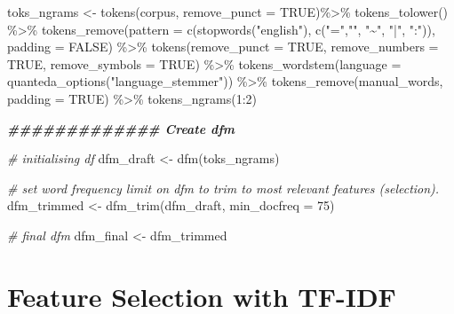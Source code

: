 \documentclass[
]{article}
\newenvironment{Shaded}{\begin{snugshade}}{\end{snugshade}}
\newcommand{\AttributeTok}[1]{\textcolor[rgb]{0.77,0.63,0.00}{#1}}
\newcommand{\CommentTok}[1]{\textcolor[rgb]{0.56,0.35,0.01}{\textit{#1}}}
\newcommand{\ConstantTok}[1]{\textcolor[rgb]{0.00,0.00,0.00}{#1}}
\newcommand{\DecValTok}[1]{\textcolor[rgb]{0.00,0.00,0.81}{#1}}
\newcommand{\DocumentationTok}[1]{\textcolor[rgb]{0.56,0.35,0.01}{\textbf{\textit{#1}}}}
\newcommand{\FunctionTok}[1]{\textcolor[rgb]{0.00,0.00,0.00}{#1}}
\newcommand{\NormalTok}[1]{#1}
\newcommand{\OtherTok}[1]{\textcolor[rgb]{0.56,0.35,0.01}{#1}}
\newcommand{\SpecialCharTok}[1]{\textcolor[rgb]{0.00,0.00,0.00}{#1}}
\newcommand{\StringTok}[1]{\textcolor[rgb]{0.31,0.60,0.02}{#1}}
\begin{document}
\begin{Shaded}
\begin{Highlighting}[]
\NormalTok{toks\_ngrams }\OtherTok{\textless{}{-}}  \FunctionTok{tokens}\NormalTok{(corpus, }\AttributeTok{remove\_punct =} \ConstantTok{TRUE}\NormalTok{)}\SpecialCharTok{\%\textgreater{}\%}
  \FunctionTok{tokens\_tolower}\NormalTok{() }\SpecialCharTok{\%\textgreater{}\%}
  \FunctionTok{tokens\_remove}\NormalTok{(}\AttributeTok{pattern =} \FunctionTok{c}\NormalTok{(}\FunctionTok{stopwords}\NormalTok{(}\StringTok{"english"}\NormalTok{), }\FunctionTok{c}\NormalTok{(}\StringTok{"="}\NormalTok{,}\StringTok{"\textasciigrave{}"}\NormalTok{, }\StringTok{"\textasciitilde{}"}\NormalTok{, }\StringTok{"|"}\NormalTok{, }\StringTok{":"}\NormalTok{)), }\AttributeTok{padding =} \ConstantTok{FALSE}\NormalTok{) }\SpecialCharTok{\%\textgreater{}\%}
  \FunctionTok{tokens}\NormalTok{(}\AttributeTok{remove\_punct =} \ConstantTok{TRUE}\NormalTok{, }\AttributeTok{remove\_numbers =} \ConstantTok{TRUE}\NormalTok{, }\AttributeTok{remove\_symbols =} \ConstantTok{TRUE}\NormalTok{) }\SpecialCharTok{\%\textgreater{}\%}
  \FunctionTok{tokens\_wordstem}\NormalTok{(}\AttributeTok{language =} \FunctionTok{quanteda\_options}\NormalTok{(}\StringTok{"language\_stemmer"}\NormalTok{)) }\SpecialCharTok{\%\textgreater{}\%}
  \FunctionTok{tokens\_remove}\NormalTok{(manual\_words, }\AttributeTok{padding =} \ConstantTok{TRUE}\NormalTok{) }\SpecialCharTok{\%\textgreater{}\%}
  \FunctionTok{tokens\_ngrams}\NormalTok{(}\DecValTok{1}\SpecialCharTok{:}\DecValTok{2}\NormalTok{)}

\DocumentationTok{\#\#\#\#\#\#\#\#\#\#\#\#\# Create dfm}

\CommentTok{\# initialising df }
\NormalTok{dfm\_draft }\OtherTok{\textless{}{-}} \FunctionTok{dfm}\NormalTok{(toks\_ngrams)}

\CommentTok{\# set word frequency limit on dfm to trim to most relevant features (selection). }
\NormalTok{dfm\_trimmed }\OtherTok{\textless{}{-}} \FunctionTok{dfm\_trim}\NormalTok{(dfm\_draft, }\AttributeTok{min\_docfreq =} \DecValTok{75}\NormalTok{)}

\CommentTok{\# final dfm}
\NormalTok{dfm\_final }\OtherTok{\textless{}{-}}\NormalTok{ dfm\_trimmed}
\end{Highlighting}
\end{Shaded}

\hypertarget{feature-selection-with-tf-idf}{%
\section{Feature Selection with
TF-IDF}\label{feature-selection-with-tf-idf}}
\end{document}
